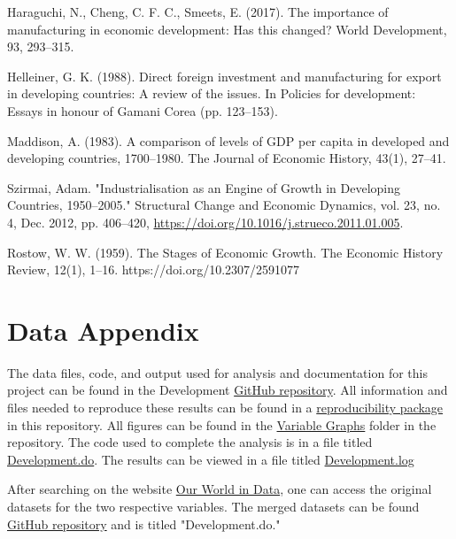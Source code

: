 \documentclass[12pt]{article}
\begin{document}
Haraguchi, N., Cheng, C. F. C., Smeets, E. (2017). The importance of manufacturing in economic development: Has this changed? World Development, 93, 293–315.

Helleiner, G. K. (1988). Direct foreign investment and manufacturing for export in developing countries: A review of the issues. In Policies for development: Essays in honour of Gamani Corea (pp. 123–153).

Maddison, A. (1983). A comparison of levels of GDP per capita in developed and developing countries, 1700–1980. The Journal of Economic History, 43(1), 27–41.

Szirmai, Adam. "Industrialisation as an Engine of Growth in Developing Countries, 1950–2005." Structural Change and Economic Dynamics, vol. 23, no. 4, Dec. 2012, pp. 406–420, \href{https://doi.org/10.1016/j.strueco.2011.01.005}{https://doi.org/10.1016/j.strueco.2011.01.005}.

Rostow, W. W. (1959). The Stages of Economic Growth. The Economic History Review, 12(1), 1–16. https://doi.org/10.2307/2591077


\newpage
\section*{Data Appendix} \label{sec:appendixa}

The data files, code, and output used for analysis and documentation for this project can be found in the Development \href{https://github.com/ecn310/course-project-developmentv}{GitHub repository}. All information and files needed to reproduce these results can be found in a \href{https://github.com/ecn310/course-project-development/tree/main/Reproducibility%20Package}{reproducibility package} in this repository. All figures can be found in the \href{https://github.com/ecn310/course-project-development/tree/main/Variable%20Graphs}{Variable Graphs} folder in the repository. The code used to complete the analysis is in a file titled \href{https://github.com/ecn310/course-project-development/tree/main/Reproducibility%20Package}{Development.do}. 
The results can be viewed in a file titled \href{https://github.com/ecn310/course-project-development/blob/main/Merge_GDP_Mftc.log}{Development.log} 
 
 After searching on the website  \href{https://ourworldindata.org/}{Our World in Data}, one can access the original datasets for the two respective variables. The merged datasets can be found \href{https://github.com/ecn310/course-project-developmentv}{GitHub repository} and is titled "Development.do."
\end{document}
